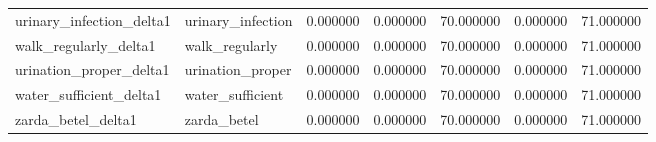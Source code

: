 \begin{longtable}{llrrrrr}
urinary\_infection\_delta1 & urinary\_infection & 0.000000 & 0.000000 & 70.000000 & 0.000000 & 71.000000 \\
walk\_regularly\_delta1 & walk\_regularly & 0.000000 & 0.000000 & 70.000000 & 0.000000 & 71.000000 \\
urination\_proper\_delta1 & urination\_proper & 0.000000 & 0.000000 & 70.000000 & 0.000000 & 71.000000 \\
water\_sufficient\_delta1 & water\_sufficient & 0.000000 & 0.000000 & 70.000000 & 0.000000 & 71.000000 \\
zarda\_betel\_delta1 & zarda\_betel & 0.000000 & 0.000000 & 70.000000 & 0.000000 & 71.000000 \\
\end{longtable}
